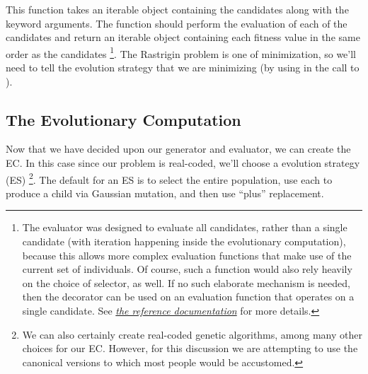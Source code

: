 \documentclass[letterpaper,10pt,english]{sphinxmanual}
\begin{document}
This function takes an iterable object containing the candidates along with the keyword arguments. The function should perform the evaluation of each of the candidates and return an iterable object containing each fitness value in the same order as the candidates \footnote{
The evaluator was designed to evaluate all candidates, rather than a single candidate (with iteration happening inside the evolutionary computation), because this allows more complex evaluation functions that make use of the current set of individuals. Of course, such a function would also rely heavily on the choice of selector, as well. If no such elaborate mechanism is needed, then the decorator  can be used on an evaluation function that operates on a single candidate. See {\hyperref[reference::doc]{\emph{the reference documentation}}} for more details.
}. The Rastrigin problem is one of minimization, so we'll need to tell the evolution strategy that we are minimizing (by using  in the call to ).


\subsection{The Evolutionary Computation}
\label{tutorial:the-evolutionary-computation}
Now that we have decided upon our generator and evaluator, we can create the EC. In this case since our problem is real-coded, we'll choose a evolution strategy (ES) \footnote{
We can also certainly create real-coded genetic algorithms, among many other choices for our EC. However, for this discussion we are attempting to use the canonical versions to which most people would be accustomed.
}. The default for an ES is to select the entire population, use each to produce a child via Gaussian mutation, and then use ``plus'' replacement.
\end{document}
